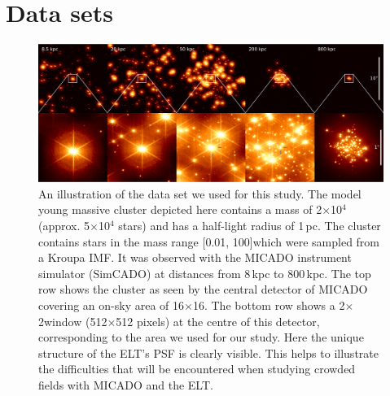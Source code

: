 \section{Data sets}
\label{sec:observations}


\begin{figure}

    \centering
    \includegraphics[width=\textwidth]{images/5_clusters.pdf}

    \caption{An illustration of the data set we used for this study. The model young massive cluster depicted here contains a mass of 2$\times$10$^4$\,\msun (approx. 5$\times$10$^4$ stars) and has a half-light radius of 1\,pc. The cluster contains stars in the mass range [0.01, 100]\msun which were sampled from a Kroupa IMF. It was observed with the MICADO instrument simulator (SimCADO) at distances from 8\,kpc to 800\,kpc. The top row shows the cluster as seen by the central detector of MICADO covering an on-sky area of 16\arcsec$\times$16\arcsec. The bottom row shows a 2\arcsec$\times$2\arcsec window (512$\times$512 pixels) at the centre of this detector, corresponding to the area we used for our study. Here the unique structure of the ELT's PSF is clearly visible. This helps to illustrate the difficulties that will be encountered when studying crowded fields with MICADO and the ELT.
    }
    
    \label{fig:5_clusters}
    
\end{figure}


